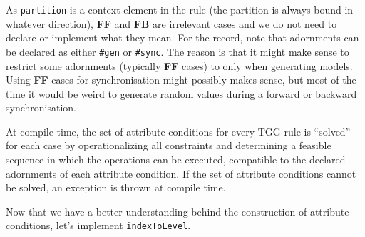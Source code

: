 As \texttt{partition} is a context element in the rule (the partition is always bound in whatever direction), \textbf{FF} and \textbf{FB} are irrelevant cases and we do not need to declare or implement what they mean.
For the record, note that adornments can be declared as either \texttt{\#gen} or \texttt{\#sync}.
The reason is that it might make sense to restrict some adornments (typically \textbf{FF} cases) to only when generating models.
Using \textbf{FF} cases for synchronisation might possibly makes sense, but most of the time it would be weird to generate random values during a forward or backward synchronisation.  

At compile time, the set of attribute conditions for every TGG rule is ``solved'' for each case by
operationalizing all constraints and determining a feasible sequence in which the operations can be executed, compatible to the declared adornments of each attribute condition. 
If the set of attribute conditions cannot be solved, an exception is thrown at compile time.

Now that we have a better understanding behind the construction of attribute conditions, let's implement \texttt{indexToLevel}.

